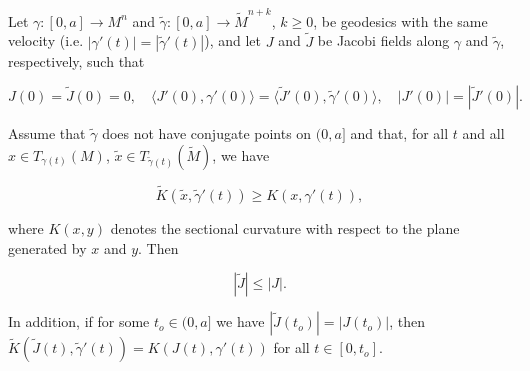 \begin{theorem}[Rauch]
  \label{thm:dc-ch10-2-3}
  Let $\gamma:[0,a]\to M^n$ and $\tilde\gamma:[0,a]\to\widetilde{M}^{n+k}$, $k\geq 0$,
  be geodesics with the same velocity (i.e. $|\gamma'(t)|=|\tilde\gamma'(t)|$), and
  let $J$ and $\tilde J$ be Jacobi fields along $\gamma$ and $\tilde\gamma$,
  respectively, such that
  
  $$
  J(0)=\tilde J(0)=0,\quad\langle J'(0),\gamma'(0)\rangle=\langle\tilde J'(0),\tilde\gamma'(0)\rangle,\quad|J'(0)|=|\tilde J'(0)|.
  $$
  
  Assume that $\tilde\gamma$ does not have conjugate points on $(0,a]$ and that, for
  all $t$ and all $x\in T_{\gamma(t)}(M)$, $\tilde x\in T_{\tilde\gamma(t)}(\widetilde{M})$,
  we have
  
  $$
  \widetilde{K}(\tilde x,\tilde\gamma'(t))\geq K(x,\gamma'(t)),
  $$
  
  where $K(x,y)$ denotes the sectional curvature with respect to the plane
  generated by $x$ and $y$. Then
  
  $$
  |\tilde J|\leq|J|.
  $$
  
  In addition, if for some $t_o\in(0,a]$ we have $|\tilde J(t_o)|=|J(t_o)|$, then
  $\widetilde{K}(\tilde J(t),\tilde\gamma'(t))=K(J(t),\gamma'(t))$ for all $t\in[0,t_o]$.
\end{theorem}
